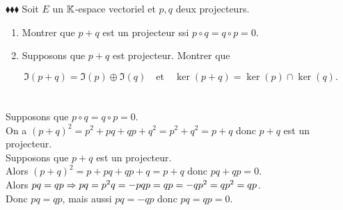 \documentclass[11pt]{article}
\begin{document}
\begin{exercise}{$\blacklozenge\blacklozenge\blacklozenge$}{}
    Soit $E$ un $\mathbb{K}$-espace vectoriel et $p,q$ deux projecteurs.
    \begin{enumerate}[topsep=0pt,itemsep=-0.9 ex]
        \item Montrer que $p+q$ est un projecteur ssi $p \circ q = q \circ p = 0$.
        \item Supposons que $p+q$ est projecteur. Montrer que
    \end{enumerate}
    \begin{equation*}
        \Im(p+q)=\Im(p)\oplus\Im(q) \quad \text{et} \quad \ker(p+q)=\ker(p)\cap\ker(q).
    \end{equation*}
    \tcblower\\[0.2cm]
    \\
    \fbox{$\Leftarrow$} Supposons que $p\circ q = q \circ p = 0$.\\
    On a $(p+q)^2=p^2 + pq + qp + q^2 = p^2 + q^2 = p + q$ donc $p+q$ est un projecteur.\\
    \fbox{$\Rightarrow$} Supposons que $p+q$ est un projecteur.\\
    Alors $(p+q)^2 = p + pq + qp + q = p + q$ donc $pq + qp = 0$.\\
    Alors $pq = qp \Rightarrow pq = p^2q = -pqp = qp = -qp^2 = qp^2 = qp$.\\
    Donc $pq = qp$, mais aussi $pq = -qp$ donc $pq = qp = 0$.
\end{exercise}
\end{document}
